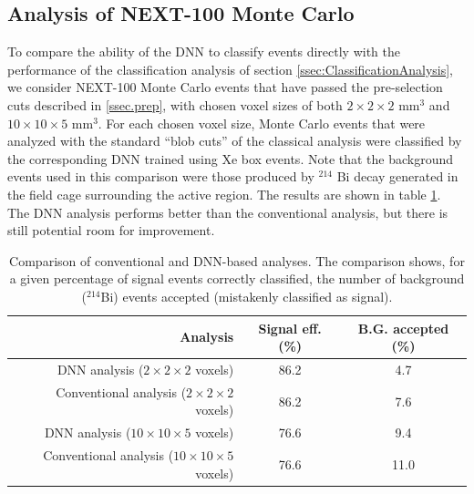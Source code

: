 \documentclass[a4paper,11pt]{article}
\begin{document}
\subsection{Analysis of NEXT-100 Monte Carlo}\label{ssec:NEXTMCanalysis}
To compare the ability of the DNN to classify events directly with the performance of the classification analysis of section \ref{ssec:ClassificationAnalysis}, we consider NEXT-100 Monte Carlo 
events that have passed the pre-selection cuts described in \ref{ssec.prep}, with chosen voxel sizes of both $2 \times 2 \times 2$ mm$^3$ and $10 \times 10 \times 5$ mm$^3$.  For each chosen voxel size,
Monte Carlo events that were analyzed with the standard ``blob cuts'' of the classical analysis were classified by the corresponding DNN trained using Xe box events.  Note that the background events
used in this comparison were those produced by $^{214}$ Bi decay generated in the field cage surrounding the active region.   The results are shown in table 
\ref{tbl.DNNcomparison}.  The DNN analysis performs better than the conventional analysis, but there is still potential room for improvement.

\begin{table}[!htb]
	\begin{center}
		\caption[DNN analysis summary]{\label{tbl.DNNcomparison}Comparison of conventional and DNN-based analyses.  The comparison shows, for a given percentage of signal events
			correctly classified, the number of background ($^{214}$Bi) events accepted (mistakenly classified as signal).}
		\begin{tabular}{rcc}
			\\
			\textbf{Analysis} & \textbf{Signal eff. (\%)} & \textbf{B.G. accepted (\%)}\\
			\hline
			DNN analysis ($2 \times 2 \times 2$ voxels) & 86.2 & 4.7\\
			Conventional analysis ($2 \times 2 \times 2$ voxels) & 86.2 & 7.6\\
			\hline
			DNN analysis ($10 \times 10 \times 5$ voxels) & 76.6 & 9.4 \\
			Conventional analysis ($10 \times 10 \times 5$ voxels) & 76.6 & 11.0 \\
		\end{tabular}
	\end{center}
\end{table}
\end{document}
